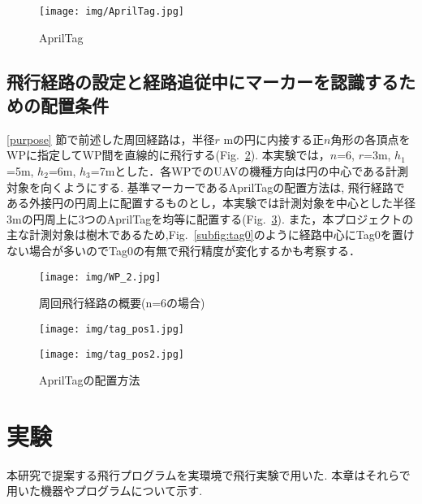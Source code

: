 \documentclass[a4j,fleqn,dvipdfmx,uplatex]{jsarticle}
\newcommand{\figref}[1]{Fig.\ \ref{#1}}
\newcommand{\subsecref}[1]{\ref{#1}\hspace{0.2zw} 節}
\begin{document}
\begin{figure}[tb]
    \centering
    \texttt{[image: img/AprilTag.jpg]}
    \caption{AprilTag}
    \label{fig:apriltags}
\end{figure}

\subsection{飛行経路の設定と経路追従中にマーカーを認識するための配置条件}\label{subsec:tag_pos}
\subsecref{purpose}で前述した周回経路は，半径$r$ mの円に内接する正$n$角形の各頂点をWPに指定してWP間を直線的に飛行する(\figref{fig:spiral_path}). 
本実験では，$n$=6, $r$=3m, $h_1$=5m, $h_2$=6m, $h_3$=7mとした．各WPでのUAVの機種方向は円の中心である計測対象を向くようにする. 
基準マーカーであるAprilTagの配置方法は, 飛行経路である外接円の円周上に配置するものとし，本実験では計測対象を中心とした半径3mの円周上に3つのAprilTagを均等に配置する(\figref{fig:tag_pos}). 
また，本プロジェクトの主な計測対象は樹木であるため,\figref{subfig:tag0}のように経路中心にTag0を置けない場合が多いのでTag0の有無で飛行精度が変化するかも考察する．

\begin{figure}[tb]
    \centering
        \texttt{[image: img/WP\_2.jpg]}
        \caption{周回飛行経路の概要(n=6の場合)}
        \label{fig:spiral_path}
\end{figure}

\begin{figure}[tb]
    \centering
    \begin{minipage}[b]{0.45\linewidth}
      \centering
      \texttt{[image: img/tag\_pos1.jpg]}
      \label{subfig:tag0}
    \end{minipage}
    \begin{minipage}[b]{0.45\linewidth}
      \centering
      \texttt{[image: img/tag\_pos2.jpg]}
      \label{subfig:notag0}
    \end{minipage}
    \caption{AprilTagの配置方法}
    \label{fig:tag_pos}
\end{figure}


\section{実験}\label{sec3}
本研究で提案する飛行プログラムを実環境で飛行実験で用いた. 本章はそれらで用いた機器やプログラムについて示す. 
\end{document}
